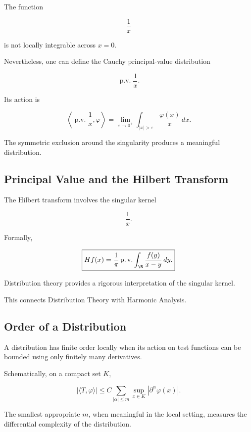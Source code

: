 The function

\[
\frac{1}{x}
\]

is not locally integrable across \(x=0\).

Nevertheless, one can define the Cauchy principal-value distribution

\[
\boxed{
\operatorname{p.v.}\frac{1}{x}.
}
\]

Its action is

\[
\boxed{
\left\langle
\operatorname{p.v.}\frac{1}{x},
\varphi
\right\rangle
=
\lim_{\varepsilon\to0^+}
\int_{|x|>\varepsilon}
\frac{\varphi(x)}{x}\,dx.
}
\]

The symmetric exclusion around the singularity produces a meaningful
distribution.

\subsection{Principal Value and the Hilbert Transform}
\label{subsec:principal-value-hilbert}

The Hilbert transform involves the singular kernel

\[
\frac{1}{x}.
\]

Formally,

\[
\boxed{
Hf(x)
=
\frac{1}{\pi}
\operatorname{p.v.}
\int_{\R}
\frac{f(y)}
{x-y}\,dy.
}
\]

Distribution theory provides a rigorous interpretation of the singular
kernel.

This connects Distribution Theory with Harmonic Analysis.

\subsection{Order of a Distribution}
\label{subsec:order-distribution}

A distribution has finite order locally when its action on test functions
can be bounded using only finitely many derivatives.

Schematically, on a compact set \(K\),

\[
\boxed{
|\langle T,\varphi\rangle|
\leq
C
\sum_{|\alpha|\leq m}
\sup_{x\in K}
|\partial^\alpha\varphi(x)|.
}
\]

The smallest appropriate \(m\), when meaningful in the local setting,
measures the differential complexity of the distribution.

